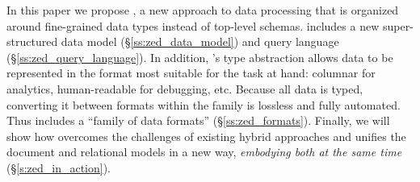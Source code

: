 In this paper we propose {\bf \sys{}}, a new approach to data processing that is organized around fine-grained data types instead of top-level schemas. \sys{} includes a new super-structured data model (\S\ref{ss:zed_data_model}) and query language (\S\ref{ss:zed_query_language}). In addition, \sys{}'s type abstraction allows data to be represented in the format most suitable for the task at hand: columnar for analytics, human-readable for debugging, etc.  Because all data is typed, converting it between formats within the family is lossless and fully automated. Thus \sys{} includes a ``family of data formats'' (\S\ref{ss:zed_formats}). Finally, we will show how \sys{} overcomes the challenges of existing hybrid approaches and unifies the document and relational models in a new way, {\em embodying both at the same time}  (\S\ref{s:zed_in_action}). %
